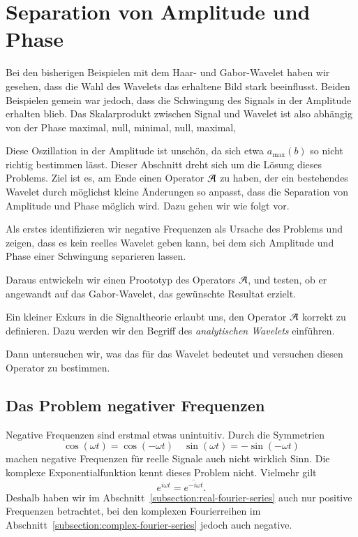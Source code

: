 \section{Separation von Amplitude und Phase}
\label{complex:separate}

Bei den bisherigen Beispielen mit dem Haar- und Gabor-Wavelet haben wir gesehen, dass die Wahl des Wavelets das erhaltene Bild stark beeinflusst.
Beiden Beispielen gemein war jedoch, dass die Schwingung des Signals in der Amplitude erhalten blieb.
Das Skalarprodukt zwischen Signal und Wavelet ist also abhängig von der Phase maximal, null, minimal, null, maximal, \textellipsis

Diese Oszillation in der Amplitude ist unschön, da sich etwa $a_\text{max}(b)$ so nicht richtig bestimmen lässt.
Dieser Abschnitt dreht sich um die Lösung dieses Problems.
Ziel ist es, am Ende einen Operator $\Ana\,$ zu haben, der ein bestehendes Wavelet durch möglichst kleine Änderungen so anpasst, dass die Separation von Amplitude und Phase möglich wird.
Dazu gehen wir wie folgt vor.

Als erstes identifizieren wir negative Frequenzen als Ursache des Problems und zeigen, dass es kein reelles Wavelet geben kann, bei dem sich Amplitude und Phase einer Schwingung separieren lassen.

Daraus entwickeln wir einen Proototyp des Operators $\Ana\,$, und testen, ob er angewandt auf das Gabor-Wavelet, das gewünschte Resultat erzielt.

Ein kleiner Exkurs in die Signaltheorie erlaubt uns, den Operator $\Ana\,$ korrekt zu definieren. 
Dazu werden wir den Begriff des \emph{analytischen Wavelets} einführen.



Dann untersuchen wir, was das für das Wavelet bedeutet und versuchen diesen Operator zu bestimmen.

\subsection{Das Problem negativer Frequenzen}
Negative Frequenzen sind erstmal etwas unintuitiv.
Durch die Symmetrien
\[
	\cos(\omega t) = \cos(-\omega t)
	\quad
	\sin(\omega t) = -\sin(-\omega t)
\]
machen negative Frequenzen für reelle Signale auch nicht wirklich Sinn.
Die komplexe Exponential\-funktion kennt dieses Problem nicht.
Vielmehr gilt
\begin{equation}
	e^{i\omega t} = \overline{e^{-i\omega t}}.\label{complex:exp-inv-conj}
\end{equation}
Deshalb haben wir im Abschnitt~\ref{subsection:real-fourier-series} auch nur positive Frequenzen betrachtet,
bei den komplexen Fourierreihen im Abschnitt~\ref{subsection:complex-fourier-series} jedoch auch negative.

